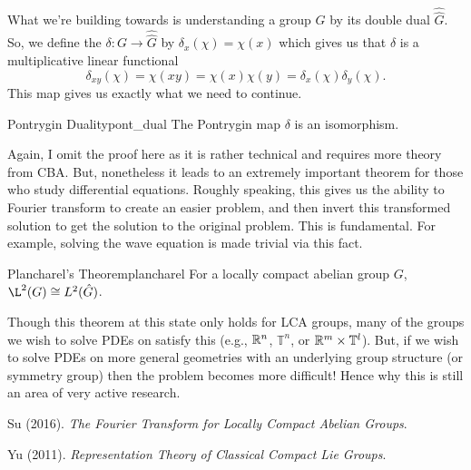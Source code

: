 What we're building towards is understanding a group $G$ by its double dual $\hat{\hat{G}}$. So, we define the  $\delta \colon G \to \hat{\hat{G}}$ by $\delta_x(\chi)=\chi(x)$ which gives us that $\delta$ is a multiplicative linear functional
\[
\delta_{xy}(\chi)=\chi(xy)=\chi(x)\chi(y)=\delta_x(\chi)\delta_y(\chi).
\]
This map gives us exactly what we need to continue.

\begin{thm}{Pontrygin Duality}{pont_dual}
    The Pontrygin map $\delta$ is an isomorphism.
\end{thm}

Again, I omit the proof here as it is rather technical and requires more theory from CBA.  But, nonetheless it leads to an extremely important theorem for those who study differential equations. Roughly speaking, this gives us the ability to Fourier transform to create an easier problem, and then invert this transformed solution to get the solution to the original problem. This is fundamental.  For example, solving the wave equation is made trivial via this fact.  

\begin{thm}{Plancharel's Theorem}{plancharel}
    For a locally compact abelian group $G$, $\L^2(G)\cong L^2(\hat{G})$.
\end{thm}

Though this theorem at this state only holds for LCA groups, many of the groups we wish to solve PDEs on satisfy this (e.g., $\mathbb{R}^n$, $\mathbb{T}^n$, or $\mathbb{R}^m\times \mathbb{T}^l$).  But, if we wish to solve PDEs on more general geometries with an underlying group structure (or symmetry group) then the problem becomes more difficult! Hence why this is still an area of very active research.


\newpage
\begin{thebibliography}{1}
    
 Su (2016). \emph{The Fourier Transform for Locally Compact Abelian Groups}. 

 Yu (2011). \emph{Representation Theory of Classical Compact Lie Groups}.
	
\end{thebibliography}

